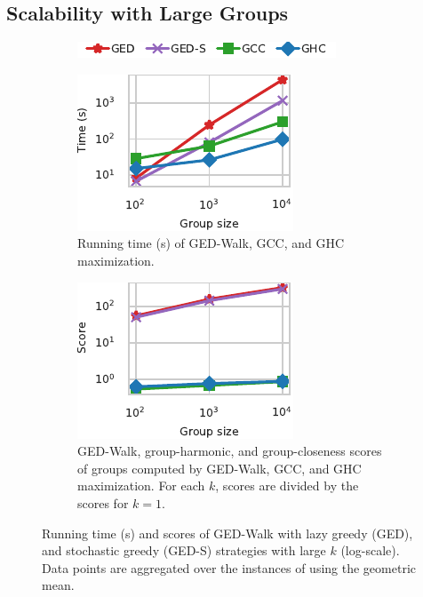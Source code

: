 \subsection{Scalability with Large Groups}
%
\begin{figure}[tb]
\centering
\begin{subfigure}[t]{\textwidth}
\centering
\includegraphics{./sources/plots/ged-walk/legend-ged-time-vs-group-large.pdf}
\end{subfigure}\medskip

\hfill
\begin{subfigure}[t]{.45\textwidth}
\centering
\includegraphics{./sources/plots/ged-walk/ged-time-vs-group-large.pdf}
\caption{Running time (s) of GED-Walk, GCC, and GHC maximization.}
\label{fig:ged-walk:large-groups-time}
\end{subfigure}\hfill
\begin{subfigure}[t]{.45\textwidth}
\centering
\includegraphics{./sources/plots/ged-walk/ged-score-vs-group-large.pdf}
\caption{GED-Walk, group-harmonic, and group-closeness scores of groups
computed by GED-Walk, GCC, and GHC maximization. For each $k$, scores are
divided by the scores for $k = 1$.}
\label{fig:ged-walk:large-groups-scores}
\end{subfigure}\hfill

\caption{Running time (s) and scores of GED-Walk with lazy greedy
(GED), and stochastic greedy (GED-S) strategies with large $k$ (log-scale).
Data points are aggregated over the instances of 
using the geometric mean.}
\end{figure}

